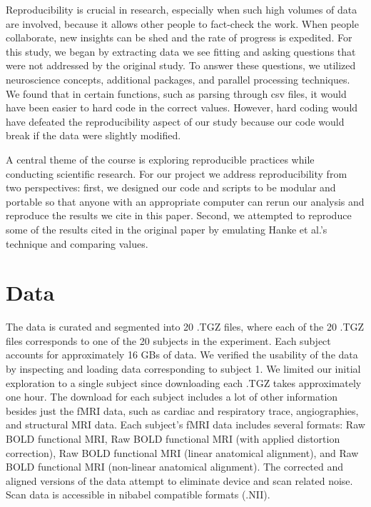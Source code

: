 \documentclass[11pt]{article}
\begin{document}
Reproducibility is crucial in research, especially when such high volumes of
data are involved, because it allows other people to fact-check the work. When
people collaborate, new insights can be shed and the rate of progress is
expedited. For this study, we began by extracting data we see fitting and
asking questions that were not addressed by the original study. To answer
these questions, we utilized neuroscience concepts, additional packages, and
parallel processing techniques. We found that in certain functions, such as
parsing through csv files, it would have been easier to hard code in the
correct values. However, hard coding would have defeated the reproducibility
aspect of our study because our code would break if the data were slightly
modified.

A central theme of the course is exploring reproducible practices while 
conducting scientific research. For our project we address reproducibility from 
two perspectives: first, we designed our code and scripts to be modular and 
portable so that anyone with an appropriate computer can rerun our analysis 
and reproduce the results we cite in this paper. Second, we attempted to 
reproduce some of the results cited in the original paper by emulating Hanke 
et al.'s technique and comparing values. 

\section{Data}

The data is curated and segmented into 20 .TGZ files, where each of the 20
.TGZ  files corresponds to one of the 20 subjects in the experiment. Each
subject  accounts for approximately 16 GBs of data. We verified the usability
of the data by inspecting and loading data corresponding to subject 1. We
limited our initial exploration to a single subject since downloading each
.TGZ takes  approximately one hour.  The download for each subject includes a
lot of other information besides just the fMRI data, such as cardiac and
respiratory trace, angiographies, and structural MRI data. Each subject's fMRI
data includes several formats: Raw BOLD functional MRI, Raw BOLD functional
MRI (with applied distortion correction), Raw BOLD functional MRI (linear
anatomical alignment), and Raw BOLD functional MRI (non-linear anatomical
alignment). The corrected and aligned versions of the data attempt to
eliminate device and scan related noise. Scan data is accessible in nibabel
compatible formats (.NII).
\end{document}

